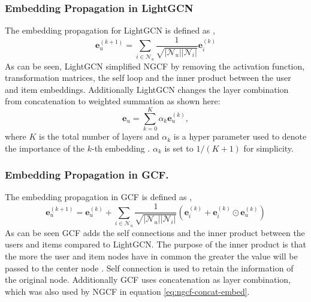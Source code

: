 \subsubsection{Embedding Propagation in LightGCN}
The embedding propagation for LightGCN is defined as \cite{lightgcn},
\begin{equation}
    \mathbf{e}_{u}^{(k+1)} = \sum^{}_{i \in \mathcal{N}_u} \frac{1}{\sqrt{|\mathcal{N}_u||\mathcal{N}_i|}} \mathbf{e}_i^{(k)}
\end{equation}
As can be seen, LightGCN simplified NGCF by removing the activation function, transformation matrices, the self loop and the inner product between the user and item embeddings.
Additionally LightGCN changes the layer combination from concatenation to weighted summation as shown here:
\begin{equation}
    \mathbf{e}_u = \sum_{k=0}^{K} \alpha_k \mathbf{e}_u^{(k)},
    \label{eq:lightgcn-sum}
\end{equation}
where $K$ is the total number of layers and $\alpha_k$ is a hyper parameter used to denote the importance of the $k$-th embedding \cite{lightgcn}.
$\alpha_k$ is set to $1 /(K + 1)$ for simplicity.

\subsubsection{Embedding Propagation in GCF.}
The embedding propagation in GCF is defined as \cite{BiTGCF},
\begin{equation}
    \mathbf{e}_{u}^{(k+1)} = \mathbf{e}_{u}^{(k)} + \sum^{}_{i \in \mathcal{N}_u}  \frac{1}{\sqrt{|\mathcal{N}_u||\mathcal{N}_i|}}\left( \mathbf{e}_i^{(k)} + \mathbf{e}_i^{(k)} \odot \mathbf{e}_u^{(k)} \right)
\end{equation}
As can be seen GCF adds the self connections and the inner product between the users and items compared to LightGCN.
The purpose of the inner product is that the more the user and item nodes have in common the greater the value will be passed to the center node \cite{BiTGCF}.
Self connection is used to retain the information of the original node.
Additionally GCF uses concatenation as layer combination, which was also used by NGCF in equation \autoref{eq:ngcf-concat-embed}.
